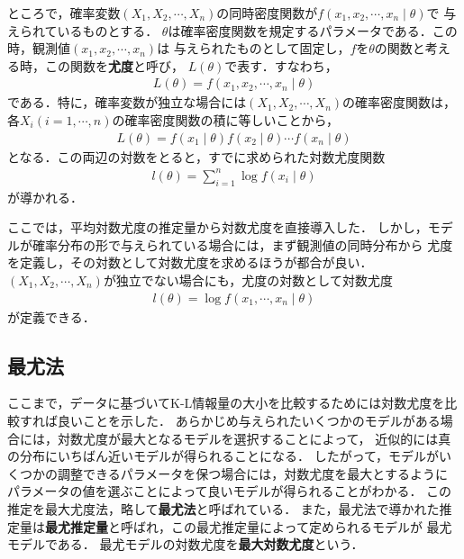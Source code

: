 ところで，確率変数$(X_1, X_2, \cdots, X_n)$の同時密度関数が$f(x_1, x_2, \cdots, x_n \mid \theta)$で
与えられているものとする．
$\theta$は確率密度関数を規定するパラメータである．この時，観測値$(x_1, x_2, \cdots, x_n)$は
与えられたものとして固定し，$f$を$\theta$の関数と考える時，この関数を\textbf{尤度}と呼び，
$L(\theta)$で表す．すなわち，
\begin{align*}
  L(\theta) = f(x_1, x_2, \cdots, x_n \mid \theta)
\end{align*}
である．特に，確率変数が独立な場合には$(X_1, X_2, \cdots, X_n)$の確率密度関数は，
各$X_i (i = 1, \cdots, n)$の確率密度関数の積に等しいことから，
\begin{align*}
  L(\theta) = f(x_1 \mid \theta)f(x_2 \mid \theta) \cdots f(x_n \mid \theta)
\end{align*}
となる．この両辺の対数をとると，すでに求められた対数尤度関数
\begin{align*}
  l(\theta) = \sum_{i=1}^{n}\log f(x_i \mid \theta)
\end{align*}
が導かれる．

ここでは，平均対数尤度の推定量から対数尤度を直接導入した．
しかし，モデルが確率分布の形で与えられている場合には，まず観測値の同時分布から
尤度を定義し，その対数として対数尤度を求めるほうが都合が良い．
$(X_1, X_2, \cdots, X_n)$が独立でない場合にも，尤度の対数として対数尤度
\begin{align*}
  l(\theta) = \log f(x_1, \cdots, x_n \mid \theta)
\end{align*}
が定義できる．

\subsection{最尤法}
ここまで，データに基づいてK-L情報量の大小を比較するためには対数尤度を比較すれば良いことを示した．
あらかじめ与えられたいくつかのモデルがある場合には，対数尤度が最大となるモデルを選択することによって，
近似的には真の分布にいちばん近いモデルが得られることになる．
したがって，モデルがいくつかの調整できるパラメータを保つ場合には，対数尤度を最大とするように
パラメータの値を選ぶことによって良いモデルが得られることがわかる．
この推定を最大尤度法，略して\textbf{最尤法}と呼ばれている．
また，最尤法で導かれた推定量は\textbf{最尤推定量}と呼ばれ，この最尤推定量によって定められるモデルが
最尤モデルである．
最尤モデルの対数尤度を\textbf{最大対数尤度}という．
